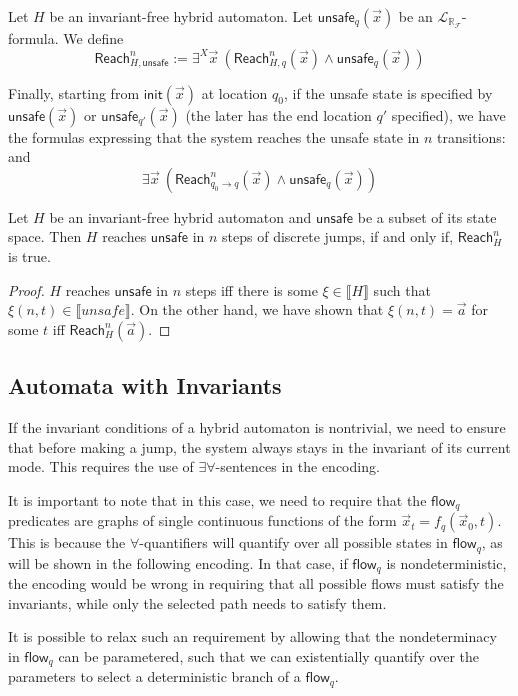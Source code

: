 \documentclass[envcountsect]{llncs}
\newcommand{\flow}{\mathsf{flow}}
\newcommand{\init}{\mathsf{init}}
\newcommand{\reach}{\mathsf{Reach}}
\newcommand{\unsafe}{\mathsf{unsafe}}
\newcommand{\lrf}{\mathcal{L}_{\mathbb{R}_{\mathcal{F}}}}
\begin{document}
\begin{definition}[$\reach^n_{H,\unsafe}$] Let $H$ be an invariant-free hybrid automaton. Let $\unsafe_q(\vec x)$ be an $\lrf$-formula. We define
$$\reach^n_{H,\unsafe}:= \exists^X \vec x \ (\reach^n_{H,q}(\vec x)\wedge \unsafe_q(\vec x))$$
\end{definition}

Finally, starting from $\init(\vec x)$ at location $q_0$, if the unsafe state is specified by $\unsafe(\vec x)$ or $\unsafe_{q'}(\vec x)$ (the later has the end location $q'$ specified), we have the formulas expressing that the system reaches the unsafe state in $n$ transitions:
and
$$\exists \vec x\ (\reach^n_{q_0\rightarrow q}(\vec x)\wedge \unsafe_q(\vec x))$$

\begin{corollary}
Let $H$ be an invariant-free hybrid automaton and $\unsafe$ be a subset of its state space. Then $H$ reaches $\unsafe$ in $n$ steps of discrete jumps, if and only if, $\reach^n_{H}$ is true. 
\end{corollary}

\begin{proof}
$H$ reaches $\unsafe$ in $n$ steps iff there is some $\xi\in \llbracket H\rrbracket$ such that $\xi(n, t)\in \llbracket unsafe\rrbracket$. On the other hand, we have shown that $\xi(n, t) = \vec a$ for some $t$ iff $\reach_H^n(\vec a)$.
\end{proof}


\subsection{Automata with Invariants}\label{auto_inv}

If the invariant conditions of a hybrid automaton is nontrivial, we need to ensure that before making a jump, the system always stays in the invariant of its current mode. This requires the use of $\exists\forall$-sentences in the encoding. 

\begin{remark}
It is important to note that in this case, we need to require that the $\flow_q$ predicates are graphs of single continuous functions of the form $\vec x_t = f_q(\vec x_0, t)$. This is because the $\forall$-quantifiers will quantify over all possible states in $\flow_q$, as will be shown in the following encoding. In that case, if $\flow_q$ is nondeterministic, the encoding would be wrong in requiring that all possible flows must satisfy the invariants, while only the selected path needs to satisfy them. 

It is possible to relax such an requirement by allowing that the nondeterminacy in $\flow_q$ can be parametered, such that we can existentially quantify over the parameters to select a deterministic branch of a $\flow_q$. 
\end{remark}
\end{document}
